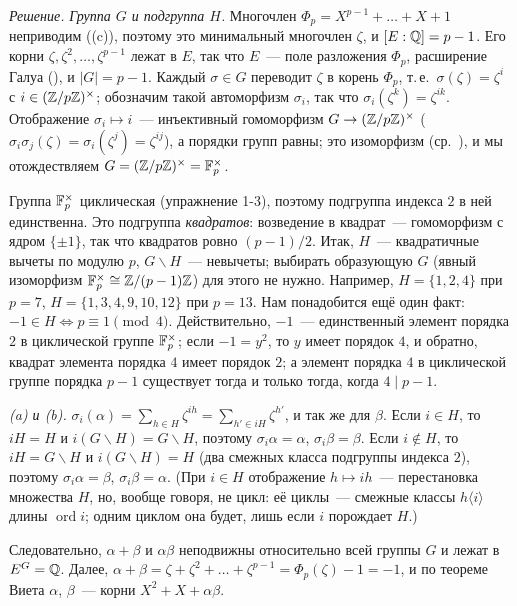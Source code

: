 \noindent\emph{Решение.} \emph{Группа $G$ и подгруппа $H$.} Многочлен $\Phi_p=X^{p-1}+\dots+X+1$ неприводим ((c)),
поэтому это минимальный многочлен $\zeta$, и $[E:\mathbb Q]=p-1$. Его корни $\zeta,\zeta^2,\dots,\zeta^{p-1}$ лежат в $E$, так что
$E$~--- поле разложения $\Phi_p$, расширение Галуа (), и $|G|=p-1$. Каждый $\sigma\in G$ переводит $\zeta$ в корень
$\Phi_p$, т.\,е.\ $\sigma(\zeta)=\zeta^i$ с $i\in(\mathbb Z/p\mathbb Z)^\times$; обозначим такой автоморфизм $\sigma_i$, так что
$\sigma_i(\zeta^k)=\zeta^{ik}$. Отображение $\sigma_i\mapsto i$~--- инъективный гомоморфизм $G\to(\mathbb Z/p\mathbb Z)^\times$
($\sigma_i\sigma_j(\zeta)=\sigma_i(\zeta^j)=\zeta^{ij}$), а порядки групп равны; это изоморфизм (ср.\ ), и мы
отождествляем $G=(\mathbb Z/p\mathbb Z)^\times=\mathbb F_p^\times$.

Группа $\mathbb F_p^\times$ циклическая (упражнение 1-3), поэтому подгруппа индекса $2$ в ней единственна. Это подгруппа
\emph{квадратов}: возведение в квадрат~--- гомоморфизм с ядром $\{\pm1\}$, так что квадратов ровно $(p-1)/2$. Итак, $H$~---
квадратичные вычеты по модулю $p$, $G\smallsetminus H$~--- невычеты; выбирать образующую $G$ (явный изоморфизм
$\mathbb F_p^\times\cong\mathbb Z/(p-1)\mathbb Z$) для этого не нужно. Например, $H=\{1,2,4\}$ при $p=7$, $H=\{1,3,4,9,10,12\}$ при $p=13$.
Нам понадобится ещё один факт: \emph{$-1\in H\iff p\equiv1\pmod4$}. Действительно, $-1$~--- единственный элемент порядка
$2$ в циклической группе $\mathbb F_p^\times$; если $-1=y^2$, то $y$ имеет порядок $4$, и обратно, квадрат элемента порядка $4$
имеет порядок $2$; а элемент порядка $4$ в циклической группе порядка $p-1$ существует тогда и только тогда, когда $4\mid p-1$.

\emph{(a) и (b).} $\sigma_i(\alpha)=\sum_{h\in H}\zeta^{ih}=\sum_{h'\in iH}\zeta^{h'}$, и так же для $\beta$. Если $i\in H$, то
$iH=H$ и $i(G\smallsetminus H)=G\smallsetminus H$, поэтому $\sigma_i\alpha=\alpha$, $\sigma_i\beta=\beta$. Если $i\notin H$, то
$iH=G\smallsetminus H$ и $i(G\smallsetminus H)=H$ (два смежных класса подгруппы индекса $2$), поэтому $\sigma_i\alpha=\beta$,
$\sigma_i\beta=\alpha$. (При $i\in H$ отображение $h\mapsto ih$~--- перестановка множества $H$, но, вообще говоря, не
цикл: её циклы~--- смежные классы $h\langle i\rangle$ длины $\operatorname{ord}i$; одним циклом она будет, лишь если $i$
порождает $H$.)

Следовательно, $\alpha+\beta$ и $\alpha\beta$ неподвижны относительно всей группы $G$ и лежат в $E^G=\mathbb Q$. Далее,
$\alpha+\beta=\zeta+\zeta^2+\dots+\zeta^{p-1}=\Phi_p(\zeta)-1=-1$, и по теореме Виета $\alpha$, $\beta$~--- корни
$X^2+X+\alpha\beta$.

